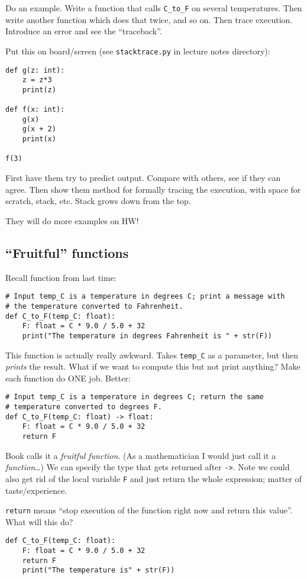 \documentclass{article}
\begin{document}
Do an example. Write a function that calls \verb|C_to_F| on several
temperatures.  Then write another function which does that twice, and
so on.  Then trace execution.  Introduce an error and see the
``traceback''.

Put this on board/screen (see \texttt{stacktrace.py} in lecture notes
directory):
\begin{verbatim}
def g(z: int):
    z = z*3
    print(z)

def f(x: int):
    g(x)
    g(x + 2)
    print(x)

f(3)
\end{verbatim}
First have them try to predict output.  Compare with others, see if
they can agree.  Then show them method for formally tracing the
execution, with space for scratch, stack, etc.  Stack grows down from
the top.

They will do more examples on HW!

\subsection*{``Fruitful'' functions}

Recall function from last time:
\begin{verbatim}
# Input temp_C is a temperature in degrees C; print a message with
# the temperature converted to Fahrenheit.
def C_to_F(temp_C: float):
    F: float = C * 9.0 / 5.0 + 32
    print("The temperature in degrees Fahrenheit is " + str(F))
\end{verbatim}
This function is actually really awkward.  Takes \verb|temp_C| as a
parameter, but then \emph{prints} the result.  What if we want to
compute this but not print anything?  Make each function do ONE job.
Better:
\begin{verbatim}
# Input temp_C is a temperature in degrees C; return the same
# temperature converted to degrees F.
def C_to_F(temp_C: float) -> float:
    F: float = C * 9.0 / 5.0 + 32
    return F
\end{verbatim}
Book calls it a \emph{fruitful function}.  (As a mathematician I would
just call it a \emph{function}\dots) We can specify the type that gets
returned after \verb|->|.  Note we could also get rid of the
local variable \verb|F| and just return the whole expression; matter of
taste/experience.

\verb|return| means ``stop execution of the function right now and
return this value''.  What will this do?

\begin{verbatim}
def C_to_F(temp_C: float):
    F: float = C * 9.0 / 5.0 + 32
    return F
    print("The temperature is" + str(F))
\end{verbatim}
\end{document}
